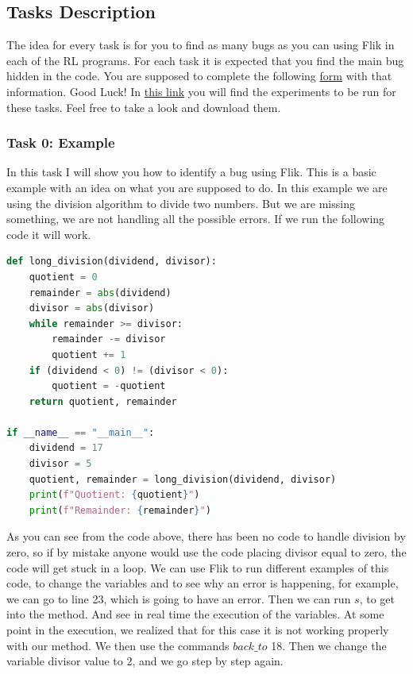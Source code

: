\subsection{Tasks Description}

The idea for every task is for you to find as many bugs as you can using Flik in each of the RL programs. 
For each task it is expected that you find the main bug hidden in the code. You are supposed to complete 
the following \href{https://forms.office.com/r/fg2AnRPfD1}{form} with that information. Good Luck!
In \href{https://github.com/larodriguez22/Flik_Experiments}{this link} you will find the experiments to be 
run for these tasks. Feel free to take a look and download them.

\subsubsection{Task 0: Example} 
In this task I will show you how to identify a bug using Flik. This is a basic example with an idea on what 
you are supposed to do. In this example we are using the division algorithm to divide two numbers. But 
we are missing something, we are not handling all the possible errors. If we run the following code it 
will work.

\begin{lstlisting}[language=Python]
def long_division(dividend, divisor):
    quotient = 0
    remainder = abs(dividend) 
    divisor = abs(divisor) 
    while remainder >= divisor:
        remainder -= divisor
        quotient += 1
    if (dividend < 0) != (divisor < 0): 
        quotient = -quotient
    return quotient, remainder

if __name__ == "__main__":
    dividend = 17
    divisor = 5
    quotient, remainder = long_division(dividend, divisor)
    print(f"Quotient: {quotient}")
    print(f"Remainder: {remainder}")
\end{lstlisting}

As you can see from the code above, there has been no code to handle division by zero, so if by mistake 
anyone would use the code placing divisor equal to zero, the code will get stuck in a loop. We can use Flik 
to run different examples of this code, to change the variables and to see why an error is happening, for 
example, we can go to line 23, which is going to have an error. Then we can run $s$, to get into the 
method. And see in real time the execution of the variables. At some point in the execution, we realized 
that for this case it is not working properly with our method. We then use the commands $back\_to$ 18. 
Then we change the variable divisor value to 2, and we go step by step again.

